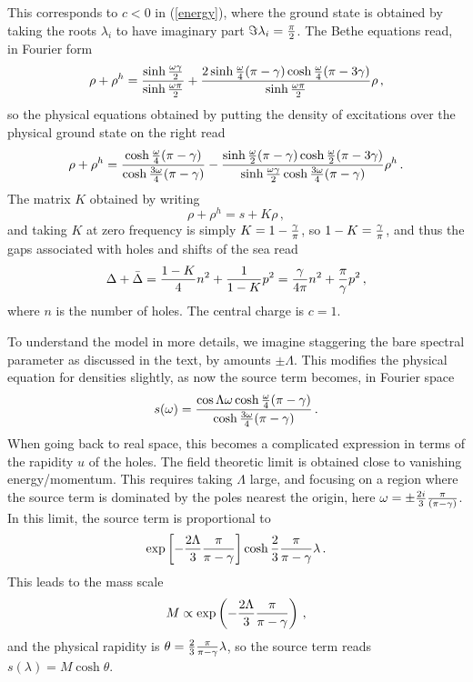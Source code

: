 \documentclass[11pt]{article}
\begin{document}
This corresponds to $c<0$ in (\ref{energy}), where the ground state is obtained by taking the roots $\lambda_i$ to have imaginary part $\Im \lambda_i = {\pi\over 2}$. 
The Bethe equations read, in Fourier form
%
\begin{equation}
\rho+\rho^h={\sinh {\omega\gamma\over 2}\over\sinh{\omega\pi\over 2}}+{2\sinh{\omega\over 4}(\pi-\gamma)\cosh{
\omega\over 4}(\pi-3\gamma)\over \sinh{\omega\pi\over 2}}\rho \,,
\end{equation}
%
so the physical equations obtained by putting the density of excitations over the physical ground state on the right  read
%
\begin{equation}
\rho+\rho^h={\cosh{\omega\over 4}(\pi-\gamma)\over \cosh{3\omega\over 4}(\pi-\gamma)}-{\sinh{\omega\over 2}(\pi-\gamma)\cosh{\omega\over 2}(\pi-3\gamma)\over\sinh{\omega\gamma\over 2}\cosh {3\omega\over 4}(\pi-\gamma)}\rho^h \,. \label{BethephysI}
\end{equation}
%
The matrix $K$ obtained by writing 
%
\begin{equation}
\rho+\rho^h=s+K\rho \,,
\end{equation}
%
and taking $K$ at zero frequency is simply $K=1-{\gamma\over\pi}$, so $1-K={\gamma\over\pi}$, and thus the gaps associated with holes and shifts of the sea read
%
\begin{equation}
\Delta+\bar{\Delta}={1-K\over 4}n^2+{1\over 1-K}p^2={\gamma\over 4\pi}n^2+{\pi\over\gamma}p^2 \,,
\end{equation}
%
where $n$ is the number of holes. The central charge is $c=1$. 

To understand the model in more details, we imagine staggering the bare spectral parameter  as discussed in the text, 
by amounts $\pm\Lambda$. This modifies the physical equation for densities slightly, as now the source term becomes, in Fourier space
%
\begin{equation}
s(\omega)={\cos\Lambda\omega \cosh{\omega\over 4}(\pi-\gamma)\over \cosh{3\omega\over 4}(\pi-\gamma)} \,.
\end{equation}
%
When going back to real space, this becomes a complicated expression in terms of the rapidity $u$ of the holes. The field theoretic limit is obtained close to vanishing energy/momentum. This requires taking $\Lambda$ large, and focusing on  a region where the source term is dominated by the poles nearest the origin, here $\omega=\pm {2i\over 3}{\pi\over (\pi-\gamma)}$. In this limit, the source term  is proportional to
$$\exp\left[-{2\Lambda\over 3}{\pi\over \pi-\gamma}\right]\cosh {2\over 3}{\pi\over \pi-\gamma}\lambda \,.$$
This leads to the mass scale
%
\begin{equation}
M\propto \exp\left(-{2\Lambda\over 3}{\pi\over \pi-\gamma}\right) \,,
\label{massscale}
\end{equation}
%
and the physical rapidity is $\theta={2\over 3}{\pi\over \pi-\gamma}\lambda$, so the source term reads $s(\lambda)=M\cosh \theta$. 
 
\end{document}
